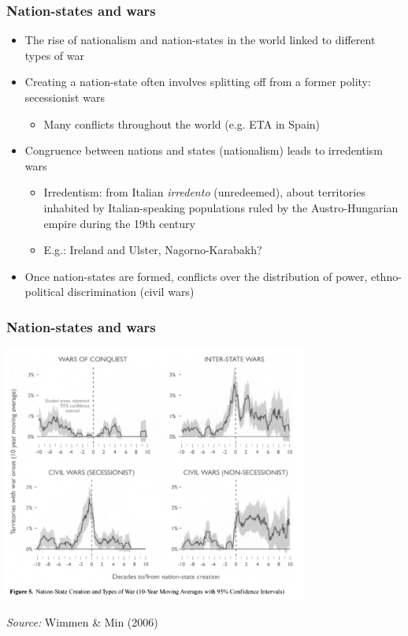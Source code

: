 \documentclass[aspectratio=43]{beamer}
\begin{document}
\begin{frame}
\frametitle{Nation-states and wars}
\centering

\begin{itemize}[<+->]
  \item The rise of nationalism and nation-states in the world linked to different types of war
  \item Creating a nation-state often involves splitting off from a former polity: secessionist wars
  \begin{itemize}
    \item Many conflicts throughout the world (e.g. ETA in Spain)
  \end{itemize}
  \item Congruence between nations and states (nationalism) leads to irredentism wars
  \begin{itemize}
    \item Irredentism: from Italian \textit{irredento} (unredeemed), about territories inhabited by Italian-speaking populations ruled by the Austro-Hungarian empire during the 19th century
    \item E.g.: Ireland and Ulster, Nagorno-Karabakh?
  \end{itemize}
  \item Once nation-states are formed, conflicts over the distribution of power, ethno-political discrimination (civil wars)
\end{itemize}

\end{frame}

\begin{frame}
\frametitle{Nation-states and wars}
\centering

\includegraphics[width = 0.75\textwidth]{img/wimmer_min_fig5}

{\scriptsize \textit{Source:} Wimmen \& Min (2006)}

\end{frame}
\end{document}
